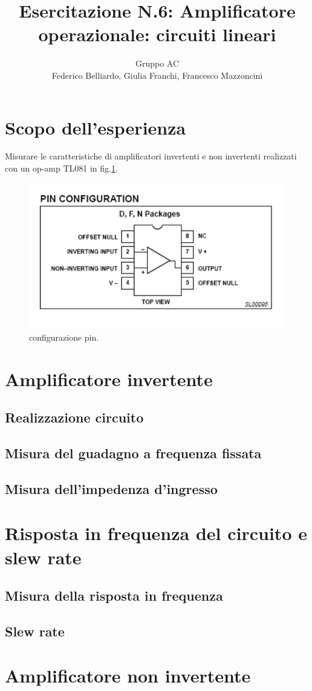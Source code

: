 \documentclass[10pt,a4paper]{article}
\author{Gruppo AC \\ Federico Belliardo, Giulia Franchi, Francesco Mazzoncini}
\title{Esercitazione N.6: Amplificatore operazionale: circuiti lineari}
\begin{document}
\section{Scopo dell'esperienza}

Misurare le caratteristiche di amplificatori invertenti e non invertenti realizzati con un op-amp TL081 in fig.\ref{pin}.
\begin{figure}[!htb]
  \centering
  \includegraphics[scale=0.3]{pinrelaz6.png}
\caption{configurazione pin.}
\label{pin}
\end{figure}

\section{Amplificatore invertente}
\subsection{Realizzazione circuito}
\subsection{Misura del guadagno a frequenza fissata}
\subsection{Misura dell'impedenza d'ingresso}
\section{Risposta in frequenza del circuito e slew rate}
\subsection{Misura della risposta in frequenza}
\subsection{Slew rate}
\section{Amplificatore non invertente}
\end{document}
